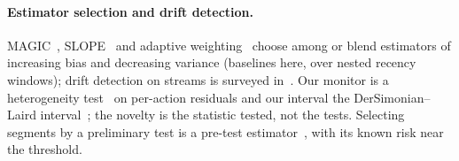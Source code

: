 \paragraph{Estimator selection and drift detection.}
MAGIC~\cite{thomas2016data}, SLOPE~\cite{su2020adaptive} and adaptive weighting~\cite{zhan2021offpolicy}
choose among or blend estimators of increasing bias and decreasing variance (baselines here,
over nested recency windows); drift detection on streams is surveyed in~\cite{gama2014survey}. Our monitor is a heterogeneity test~\cite{cochran1954combination}
on per-action residuals and our interval the DerSimonian--Laird interval~\cite{dersimonian1986meta};
the novelty is the statistic tested, not the tests. Selecting segments by a preliminary test is a
pre-test estimator~\cite{bancroft1944biases}, with its known risk near the threshold.
